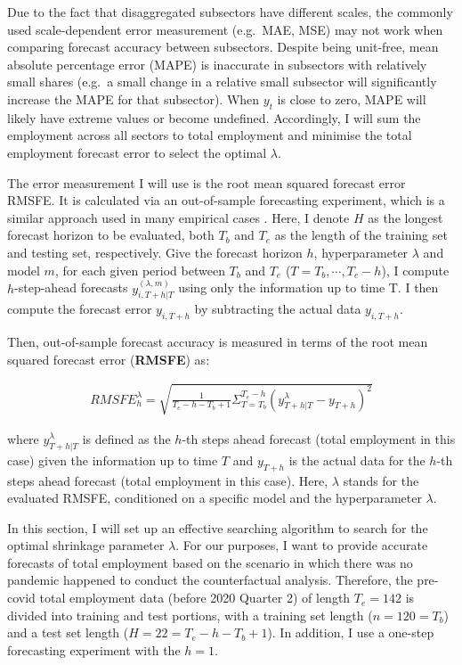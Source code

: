 \documentclass{monashthesis}
\begin{document}
Due to the fact that disaggregated subsectors have different scales, the commonly used scale-dependent error measurement (e.g.~MAE, MSE) may not work when comparing forecast accuracy between subsectors. Despite being unit-free, mean absolute percentage error (MAPE) is inaccurate in subsectors with relatively small shares (e.g.~a small change in a relative small subsector will significantly increase the MAPE for that subsector). When \(y_t\) is close to zero, MAPE will likely have extreme values or become undefined. Accordingly, I will sum the employment across all sectors to total employment and minimise the total employment forecast error to select the optimal \(\lambda\).

The error measurement I will use is the root mean squared forecast error RMSFE. It is calculated via an out-of-sample forecasting experiment, which is a similar approach used in many empirical cases \autocite{banbura2010large,koop2013}. Here, I denote \(H\) as the longest forecast horizon to be evaluated, both \(T_{b}\) and \(T_{e}\) as the length of the training set and testing set, respectively. Give the forecast horizon \(h\), hyperparameter \(\lambda\) and model \(m\), for each given period between \(T_{b}\) and \(T_{e}\) (\(T=T_b,\cdots,T_{e}-h\)), I compute \(h\)-step-ahead forecasts \({y}_{i,T+h|T}^{(\lambda,m)}\) using only the information up to time T. I then compute the forecast error \(y_{i,T+h}\) by subtracting the actual data \(y_{i,T+h}\).

Then, out-of-sample forecast accuracy is measured in terms of the root mean squared forecast error (\textbf{RMSFE}) as:

\[
\begin{aligned}
RMSFE^{\lambda}_{h}=\sqrt{\frac{1}{T_e-h-T_b+1}\Sigma^{T_{e}-h}_{T=T_{b}}({y}_{T+h|T}^{\lambda}-y_{T+h})^2}
\end{aligned}
\]

where \({y}_{T+h|T}^{\lambda}\) is defined as the \(h\)-th steps ahead forecast (total employment in this case) given the information up to time \(T\) and \(y_{T+h}\) is the actual data for the \(h\)-th steps ahead forecast (total employment in this case). Here, \(\lambda\) stands for the evaluated RMSFE, conditioned on a specific model and the hyperparameter \(\lambda\).

In this section, I will set up an effective searching algorithm to search for the optimal shrinkage parameter \(\lambda\). For our purposes, I want to provide accurate forecasts of total employment based on the scenario in which there was no pandemic happened to conduct the counterfactual analysis. Therefore, the pre-covid total employment data (before 2020 Quarter 2) of length \(T_e=142\) is divided into training and test portions, with a training set length (\(n=120=T_b\)) and a test set length (\(H=22=T_e-h-T_b+1\)). In addition, I use a one-step forecasting experiment with the \(h=1\).
\end{document}
